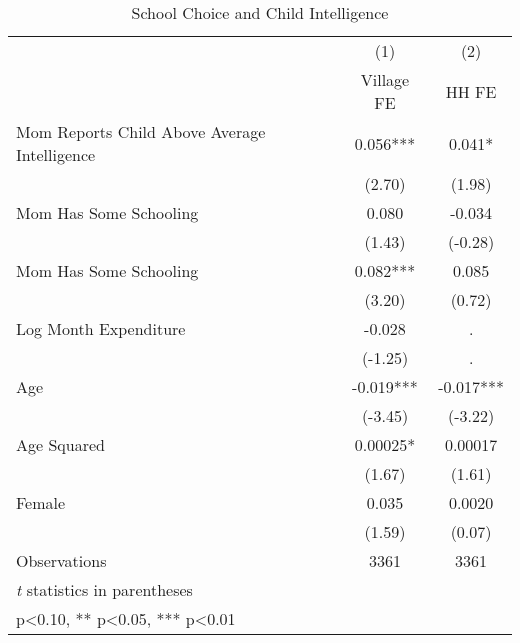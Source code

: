 \begin{table}[htbp]\centering
\def\sym#1{\ifmmode^{#1}\else\(^{#1}\)\fi}
\caption{School Choice and Child Intelligence\label{hhselection}}
\begin{tabular}{l*{2}{c}}
\hline\hline
                &\multicolumn{1}{c}{(1)}&\multicolumn{1}{c}{(2)}\\
                &\multicolumn{1}{c}{Village FE}&\multicolumn{1}{c}{HH FE}\\
\hline
Mom Reports Child Above Average Intelligence&    0.056***&    0.041*  \\
                &   (2.70)   &   (1.98)   \\
Mom Has Some Schooling&    0.080   &   -0.034   \\
                &   (1.43)   &  (-0.28)   \\
Mom Has Some Schooling&    0.082***&    0.085   \\
                &   (3.20)   &   (0.72)   \\
Log Month Expenditure&   -0.028   &        .   \\
                &  (-1.25)   &        .   \\
Age             &   -0.019***&   -0.017***\\
                &  (-3.45)   &  (-3.22)   \\
Age Squared     &  0.00025*  &  0.00017   \\
                &   (1.67)   &   (1.61)   \\
Female          &    0.035   &   0.0020   \\
                &   (1.59)   &   (0.07)   \\
\hline
Observations    &     3361   &     3361   \\
\hline\hline
\multicolumn{3}{l}{\footnotesize \textit{t} statistics in parentheses}\\
\multicolumn{3}{l}{\footnotesize * p<0.10, ** p<0.05, *** p<0.01}\\
\end{tabular}
\end{table}
